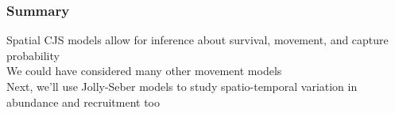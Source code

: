 \documentclass[color=usenames,dvipsnames]{beamer}\usepackage[]{graphicx}\usepackage[]{color}
\begin{document}
\begin{frame}
  \frametitle{Summary}
  \large
  Spatial CJS models allow for inference about survival,
  movement, and capture probability \\
  \pause \vfill
  We could have considered many other movement models \\
  \pause \vfill
  Next, we'll use Jolly-Seber models to study spatio-temporal
  variation in abundance and recruitment too \\
\end{frame}



\end{document}
